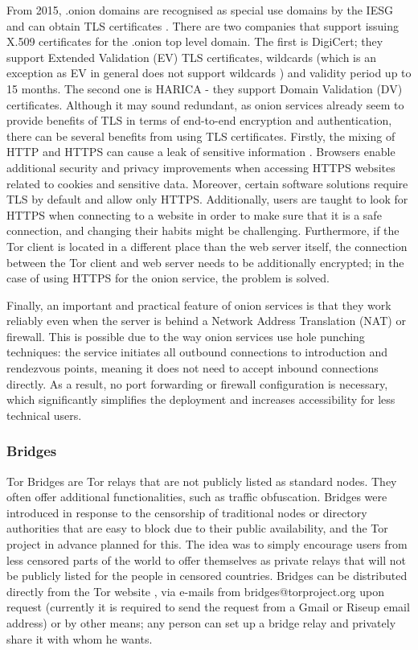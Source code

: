 From 2015, .onion domains are recognised as special use domains by the IESG and can obtain TLS certificates \cite{rfc-onion-domain}. There are two companies that support issuing X.509 certificates for the .onion top level domain. The first is DigiCert; they support Extended Validation (EV) TLS certificates,  wildcards (which is an exception as EV in general does not support wildcards \cite{digicert}) and validity period up to 15 months. The second one is HARICA - they support Domain Validation (DV) certificates. Although it may sound redundant, as onion services already seem to provide benefits of TLS in terms of end-to-end encryption and authentication, there can be several benefits from using TLS certificates. Firstly, the mixing of HTTP and HTTPS can cause a leak of sensitive information \cite{harica}. Browsers enable additional security and privacy improvements when accessing HTTPS websites related to cookies and sensitive data. Moreover, certain software solutions require TLS by default and allow only HTTPS. Additionally, users are taught to look for HTTPS when connecting to a website in order to make sure that it is a safe connection, and changing their habits might be challenging. Furthermore, if the Tor client is located in a different place than the web server itself, the connection between the Tor client and web server needs to be additionally encrypted; in the case of using HTTPS for the onion service, the problem is solved.

Finally, an important and practical feature of onion services is that they work reliably even when the server is behind a Network Address Translation (NAT) or firewall. This is possible due to the way onion services use hole punching techniques: the service initiates all outbound connections to introduction and rendezvous points, meaning it does not need to accept inbound connections directly. As a result, no port forwarding or firewall configuration is necessary, which significantly simplifies the deployment and increases accessibility for less technical users.

\subsubsection{Bridges}
Tor Bridges are Tor relays that are not publicly listed as standard nodes. They often offer additional functionalities, such as traffic obfuscation. Bridges were introduced in response to the censorship of traditional nodes or directory authorities that are easy to block due to their public availability, and the Tor project in advance planned for this. The idea was to simply encourage users from less censored parts of the world to offer themselves as private relays that will not be publicly listed for the people in censored countries.
Bridges can be distributed directly from the Tor website \cite{tor-bridges}, via e-mails from bridges@torproject.org upon request (currently it is required to send the request from a Gmail or Riseup email address) or by other means; any person can set up a bridge relay and privately share it with whom he wants.

